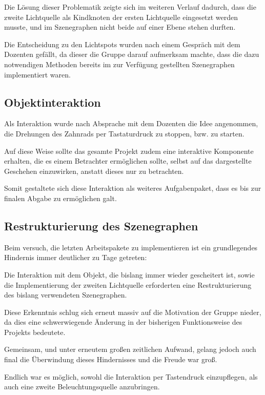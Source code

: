 \documentclass{article}
\begin{document}
Die Lösung dieser Problematik zeigte sich im weiteren Verlauf dadurch, dass die zweite Lichtquelle als Kindknoten der ersten Lichtquelle eingesetzt werden musste, und im Szenegraphen nicht beide auf einer Ebene stehen durften. 

Die Entscheidung zu den Lichtspots wurden nach einem Gespräch mit dem Dozenten gefällt, da dieser die Gruppe darauf aufmerksam machte, dass die dazu notwendigen Methoden bereits im zur Verfügung gestellten Szenegraphen implementiert waren. 



\subsection{Objektinteraktion}
Als Interaktion wurde nach Absprache mit dem Dozenten die Idee angenommen, die Drehungen des Zahnrads per Tastaturdruck zu stoppen, bzw. zu starten. 

Auf diese Weise sollte das gesamte Projekt zudem eine interaktive Komponente erhalten, die es einem Betrachter ermöglichen sollte, selbst auf das dargestellte Geschehen einzuwirken, anstatt dieses nur zu betrachten. 

Somit gestaltete sich diese Interaktion als weiteres Aufgabenpaket, dass es bis zur finalen Abgabe zu ermöglichen galt. 



\subsection{Restrukturierung des Szenegraphen}
Beim versuch, die letzten Arbeitspakete zu implementieren ist ein grundlegendes Hindernis immer deutlicher zu Tage getreten: 

Die Interaktion mit dem Objekt, die bislang immer wieder gescheitert ist, sowie die Implementierung der zweiten Lichtquelle erforderten eine Restrukturierung des bislang verwendeten Szenegraphen. 

Diese Erkenntnis schlug sich erneut massiv auf die Motivation der Gruppe nieder, da dies eine schwerwiegende Änderung in der bisherigen Funktionsweise des Projekts bedeutete. 

Gemeinsam, und unter erneutem großen zeitlichen Aufwand, gelang jedoch auch final die Überwindung dieses Hindernisses und die Freude war groß. 

Endlich war es möglich, sowohl die Interaktion per Tastendruck einzupflegen, als auch eine zweite Beleuchtungsquelle anzubringen. 
\end{document}
